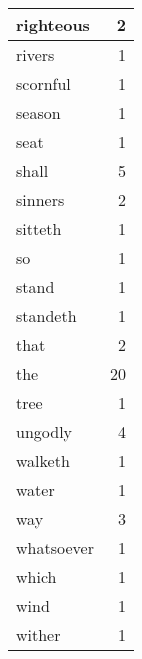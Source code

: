 \begin{center}
\begin{longtable}{l|r}
righteous & 2 \\ \hline
rivers & 1 \\ \hline
scornful & 1 \\ \hline
season & 1 \\ \hline
seat & 1 \\ \hline
shall & 5 \\ \hline
sinners & 2 \\ \hline
sitteth & 1 \\ \hline
so & 1 \\ \hline
stand & 1 \\ \hline
standeth & 1 \\ \hline
that & 2 \\ \hline
the & 20 \\ \hline
tree & 1 \\ \hline
ungodly & 4 \\ \hline
walketh & 1 \\ \hline
water & 1 \\ \hline
way & 3 \\ \hline
whatsoever & 1 \\ \hline
which & 1 \\ \hline
wind & 1 \\ \hline
wither & 1 \\ \hline
\end{longtable}
\end{center}



\normalsize



